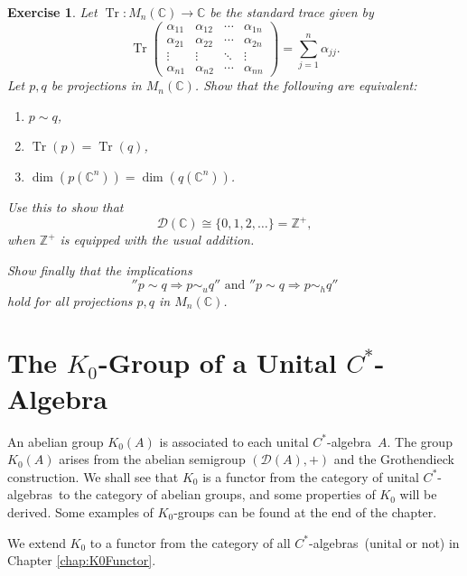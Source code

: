 \documentclass{book}
\newtheorem{exercise}{Exercise}[section]
\def\cstar{\(C^*\)-algebra}
\def\cstars{\(C^*\)-algebras}
\begin{document}
\begin{exercise}\label{ex:Lars29}
  Let \(\operatorname{Tr}:M_n(\mathbb{C})\to\mathbb{C}\) be the standard trace given by
  \[
    \operatorname{Tr}\begin{pmatrix}
      \alpha_{11}&\alpha_{12}&\cdots&\alpha_{1n}\\
      \alpha_{21}&\alpha_{22}&\cdots&\alpha_{2n}\\
      \vdots&\vdots&\ddots&\vdots\\
      \alpha_{n1}&\alpha_{n2}&\cdots&\alpha_{nn}
    \end{pmatrix}
    =\sum_{j=1}^n\alpha_{jj}.
  \]
  Let \(p,q\) be projections in \(M_n(\mathbb{C})\). Show that the following are equivalent:
  \begin{enumerate}
    \item \(p\sim q\),
    \item \(\operatorname{Tr}(p)=\operatorname{Tr}(q)\),
    \item \(\dim(p(\mathbb{C}^n))=\dim(q(\mathbb{C}^n))\).
  \end{enumerate}
  Use this to show that 
  \[
    \mathcal{D}(\mathbb{C})\cong\{0,1,2,\ldots\}=\mathbb{Z}^+,
  \]
  when \(\mathbb{Z}^+\) is equipped with the usual addition.\par
  Show finally that the implications 
  \[
    ''p\sim q\Rightarrow p\sim_u q''\text{ and }''p\sim q\Rightarrow p\sim_h q''
  \]
  hold for all projections \(p,q\) in \(M_n(\mathbb{C})\). 
\end{exercise}










\chapter{The \texorpdfstring{\(K_0\)}{K0}-Group of a Unital \texorpdfstring{\(C^*\)}{C*}-Algebra}
An abelian group \(K_0(A)\) is associated to each unital \cstar\ \(A\).
The group \(K_0(A)\) arises from the abelian semigroup \((\mathcal{D}(A),+)\) and the Grothendieck construction.
We shall see that \(K_0\) is a functor from the category of unital \cstars\ to the category of abelian groups,
and some properties of \(K_0\) will be derived. Some examples of \(K_0\)-groups can be found at the end of the chapter.\par
We extend \(K_0\) to a functor from the category of all \cstars\ (unital or
not) in Chapter \ref{chap:K0Functor}.
\end{document}
